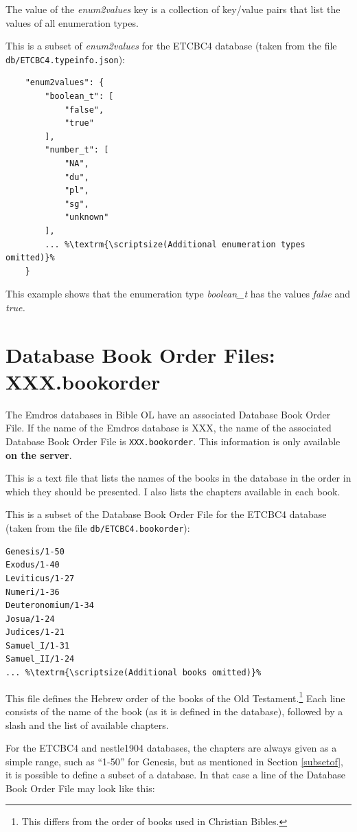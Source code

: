 \documentclass[11pt,oneside,a4paper]{memoir}
\begin{document}
The value of the \emph{enum2values} key is a collection of key/value pairs that list the values of
all enumeration types.

This is a subset of \emph{enum2values} for the ETCBC4 database (taken from the file
\texttt{db/ETCBC4.typeinfo.json}):

\begin{lstlisting}
    "enum2values": {
        "boolean_t": [
            "false",
            "true"
        ],
        "number_t": [
            "NA",
            "du",
            "pl",
            "sg",
            "unknown"
        ],
        ... %\textrm{\scriptsize(Additional enumeration types omitted)}%
    }
\end{lstlisting}

This example shows that the enumeration type \emph{boolean\_t} has the values \emph{false} and
\emph{true.}

\section{Database Book Order Files: XXX.bookorder}

The Emdros databases in Bible OL have an associated Database Book Order File. If the name of
the Emdros database is XXX, the name of the associated Database Book Order File is
\texttt{XXX.bookorder}. This information is only available \textbf{on the server}.

This is a text file that lists the names of the books in the database in the order in which they
should be presented. I also lists the chapters available in each book.

This is a subset of the Database Book Order File for the ETCBC4 database (taken from the file
\texttt{db/ETCBC4.bookorder}):

\begin{lstlisting}
Genesis/1-50
Exodus/1-40
Leviticus/1-27
Numeri/1-36
Deuteronomium/1-34
Josua/1-24
Judices/1-21
Samuel_I/1-31
Samuel_II/1-24
... %\textrm{\scriptsize(Additional books omitted)}%
\end{lstlisting}

This file defines the Hebrew order of the books of the Old Testament.\footnote{This differs from the
  order of books used in Christian Bibles.} Each line consists of the name of the book (as it is
defined in the database), followed by a slash and the list of available chapters.

For the ETCBC4 and nestle1904 databases, the chapters are always given as a simple range, such as
``1-50'' for Genesis, but as mentioned in Section \ref{subsetof}, it is possible to define a
subset of a database. In that case a line of the Database Book Order File may look like this:
\end{document}
